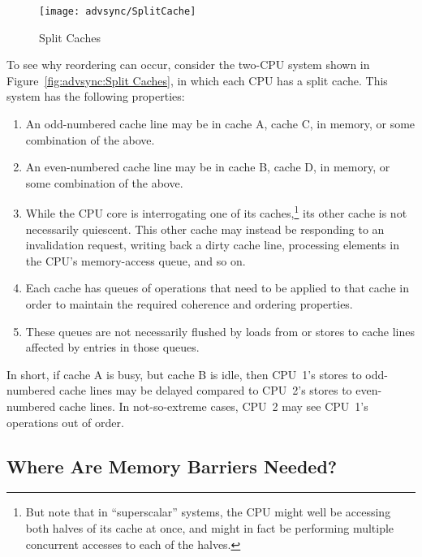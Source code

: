 \begin{figure}[htb]
\begin{center}
\texttt{[image: advsync/SplitCache]}
\end{center}
\caption{Split Caches}
\end{figure}

To see why reordering can occur, consider the two-CPU system shown in
Figure~\ref{fig:advsync:Split Caches}, in which each CPU has a split
cache.
This system has the following properties:
\begin{enumerate}
\item	An odd-numbered cache line may be in cache A, cache C,
	in memory, or some combination of the above.
\item	An even-numbered cache line may be in cache B, cache D,
	in memory, or some combination of the above.
\item	While the CPU core is interrogating one of its caches,\footnote{
		But note that in ``superscalar'' systems, the CPU
		might well be accessing both halves of its cache at
		once, and might in fact be performing multiple concurrent
		accesses to each of the halves.}
	its other cache is not necessarily quiescent.
	This other cache may instead be responding to an invalidation
	request, writing back a dirty cache line,
	processing elements in the CPU's memory-access queue, and
	so on.
\item	Each cache has queues of operations that need to be applied
	to that cache in order to maintain the required coherence
	and ordering properties.
\item	These queues are not necessarily flushed by loads from or
	stores to cache lines affected by entries in those queues.
\end{enumerate}

In short, if cache A is busy, but cache B is idle, then CPU~1's
stores to odd-numbered cache lines may be delayed compared to
CPU~2's stores to even-numbered cache lines.
In not-so-extreme cases, CPU~2 may see CPU~1's operations out
of order.

	 {}

\subsection{Where Are Memory Barriers Needed?}
\label{sec:advsync:Where Are Memory Barriers Needed?}

